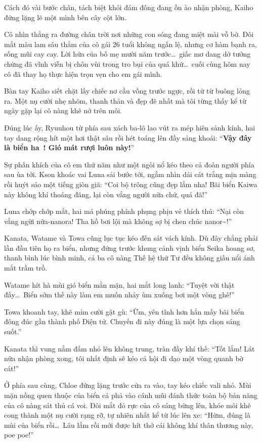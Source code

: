 \documentclass[../main.tex]{subfiles}
\begin{document}
Cách đó vài bước chân, tách biệt khỏi đám đông đang ồn ào nhận phòng, Kaiho đứng lặng lẽ một mình bên cây cột lớn.

Cô nhìn thẳng ra đường chân trời nơi những con sóng đang miệt mài vỗ bờ. Đôi mắt màu lam sâu thẳm của cô gái 26 tuổi không ngấn lệ, nhưng cơ hàm bạnh ra, sống mũi cay cay. Lời hứa của bố mẹ mười năm trước\dots\ giấc mơ dang dở tưởng chừng đã vĩnh viễn bị chôn vùi trong tro bụi của quá khứ\dots\ cuối cùng hôm nay cô đã thay họ thực hiện trọn vẹn cho em gái mình.

Bàn tay Kaiho siết chặt lấy chiếc nơ cầu vồng trước ngực, rồi từ từ buông lỏng ra. Một nụ cười nhẹ nhõm, thanh thản và đẹp đẽ nhất mà tôi từng thấy kể từ ngày gặp lại cô nàng khẽ nở trên môi.

Đúng lúc ấy, Ryuuhou từ phía sau xách ba-lô lao vút ra mép hiên sảnh kính, hai tay dang rộng hít một hơi thật sâu rồi hét toáng lên đầy sảng khoái: ``\textbf{Vậy đây là biển ha~! Gió mát rượi luôn này!}''

Sự phấn khích của cô em thứ năm như một ngòi nổ kéo theo cả đoàn người phía sau ùa tới. Kson khoác vai Luna sải bước tới, ngắm nhìn dải cát trắng mịn màng rồi huýt sáo một tiếng giòn giã: ``Coi bộ trông cũng đẹp lắm nha! Bãi biển Kaiwa này không khí thoáng đãng, lại còn vắng người nữa chứ, quá đã!''

Luna chớp chớp mắt, hai má phúng phính phụng phịu vẻ thích thú: ``Nại còn vắng ngừi nữa-nanora! Tha hồ bơi lội mà không sợ bị chen chúc nanor\~{}!''

Kanata, Watame và Towa cũng lục tục kéo đến sát vách kính. Dù đây chẳng phải lần đầu tiên họ ra biển, nhưng đứng trước khung cảnh vịnh biển Seika hoang sơ, thanh bình lúc bình minh, cả ba cô nàng Thế hệ thứ Tư đều không giấu nổi ánh mắt trầm trồ.

Watame hít hà mùi gió biển mằn mặn, hai mắt long lanh: ``Tuyệt vời thật đấy\dots\ Biển sớm thế này làm em muốn nhảy ùm xuống bơi một vòng ghê!''

Towa khoanh tay, khẽ mỉm cười gật gù: ``Ừm, yên tĩnh hơn hẳn mấy bãi biển đông đúc gần thành phố Điện tử. Chuyến đi này đúng là một lựa chọn sáng suốt.''

Kanata thì vung nắm đấm nhỏ lên không trung, tràn đầy khí thế: ``Tốt lắm! Lát nữa nhận phòng xong, tôi nhất định sẽ kéo cả hội đi dạo một vòng quanh bờ cát!''

Ở phía sau cùng, Chloe đứng lặng trước cửa ra vào, tay kéo chiếc vali nhỏ. Mùi mặn nồng quen thuộc của biển cả phả vào cánh mũi đánh thức toàn bộ bản năng của cô nàng sát thủ cá voi. Đôi mắt đỏ rực của cô sáng bừng lên, khóe môi khẽ cong thành một nụ cười rạng rỡ, tự nhiên nhất kể từ lúc lên xe: ``Hừm, đúng là mùi của biển rồi\dots\ Lâu lắm rồi mới được hít thở cái không khí thân thương này, poe poe!''
\end{document}
